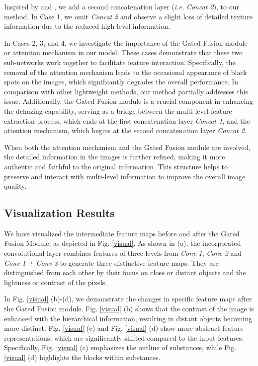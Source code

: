 \documentclass[lettersize,journal]{IEEEtran}
\begin{document}
Inspired by \cite{li2017aod} and \cite{ullah2021light}, we add a second concatenation layer (\textit{i.e.} \textit{Concat 2}), to our method. In Case 1, we omit \textit{Concat 2} and observe a slight loss of detailed texture information due to the reduced high-level information. 

In Cases 2, 3, and 4, we investigate the importance of the Gated Fusion module or attention mechanism in our model. These cases demonstrate that these two sub-networks work together to facilitate feature interaction. Specifically, the removal of the attention mechanism leads to the occasional appearance of black spots on the images, which significantly degrades the overall performance. In comparison with other lightweight methods, our method partially addresses this issue. Additionally, the Gated Fusion module is a crucial component in enhancing the dehazing capability, serving as a bridge between the multi-level feature extraction process, which ends at the first concatenation layer \textit{Concat 1}, and the attention mechanism, which begins at the second concatenation layer \textit{Concat 2}. 

When both the attention mechanism and the Gated Fusion module are involved, the detailed information in the images is further refined, making it more authentic and faithful to the original information. This structure helps to preserve and interact with multi-level information to improve the overall image quality.  

\subsection{Visualization Results}
We have visualized the intermediate feature maps before and after the Gated Fusion Module, as  depicted in Fig. \ref{visual}. As shown in (a), the incorporated convolutional layer combines features of three levels from \textit{Conv 1}, \textit{Conv 2} and \textit{Conv 1 + Conv 3} to generate three distinctive feature maps. They are distinguished from each other by their focus on close or distant objects and the lightness or contrast of the pixels. 

In Fig. \ref{visual} (b)-(d), we demonstrate the changes in specific feature maps after the Gated Fusion module. Fig. \ref{visual} (b) shows that the contrast of the image is enhanced with the hierarchical information, resulting in distant objects becoming more distinct. Fig. \ref{visual} (c) and Fig. \ref{visual} (d) show more abstract feature representations, which are significantly shifted compared to the input features. Specifically, Fig. \ref{visual} (c) emphasizes the outline of substances, while Fig. \ref{visual} (d) highlights the blocks within substances.
\end{document}
